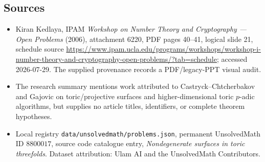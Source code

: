 \documentclass[11pt]{article}
\begin{document}
\subsection{Sources}
\begin{itemize}
\item Kiran Kedlaya, IPAM \emph{Workshop on Number Theory and Cryptography --- Open Problems} (2006), attachment 6220, PDF pages 40--41, logical slide 21, schedule source \url{https://www.ipam.ucla.edu/programs/workshops/workshop-i-number-theory-and-cryptography-open-problems/?tab=schedule}; accessed 2026-07-29. The supplied provenance records a PDF/legacy-PPT visual audit.
\item The research summary mentions work attributed to Castryck--Chtcherbakov and Gajovic on toric/projective surfaces and higher-dimensional toric $p$-adic algorithms, but supplies no article titles, identifiers, or complete theorem hypotheses.
\item Local registry \texttt{data/unsolvedmath/problems.json}, permanent UnsolvedMath ID $8800017$, source code catalogue entry, \emph{Nondegenerate surfaces in toric threefolds}. Dataset attribution: Ulam AI and the UnsolvedMath Contributors.
\end{itemize}
\end{document}
